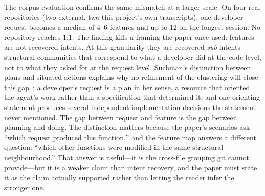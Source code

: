 The corpus evaluation confirms the same mismatch at a larger scale. On four
real repositories (two external, two this project's own transcripts), one
developer request becomes a median of 4--6 \sgt{} features and up to 12 on the
longest session. No repository reaches 1:1. The finding kills a framing the paper
once used: features are not recovered intents. At this granularity they are
recovered \emph{sub}-intents---structural communities that correspond to what a
developer did at the code level, not to what they asked for at the request level.
Suchman's distinction between plans and situated actions explains why no
refinement of the clustering will close this gap~\cite{suchman1987}: a
developer's request is a plan in her sense, a resource that oriented the agent's
work rather than a specification that determined it, and one orienting statement
produces several independent implementation decisions the statement never
mentioned. The gap between request and feature is the gap between planning and
doing.
The distinction matters because the paper's scenarios ask ``which request produced
this function,'' and the feature map answers a different question: ``which other
functions were modified in the same structural neighbourhood.'' That answer is
useful---it is the cross-file grouping git cannot provide---but it is a weaker
claim than intent recovery, and the paper must state it as the claim actually
supported rather than letting the reader infer the stronger one.

